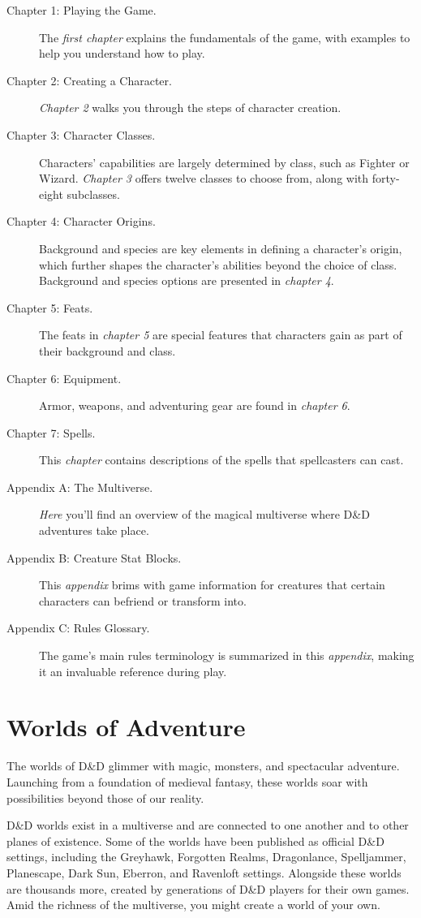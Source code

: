 \documentclass[10pt,a4paper,twoside,bg=print,twocolumn,openany,nodeprecatedcode]{dndbook}
\begin{document}
\begin{description}
\item[Chapter 1: Playing the Game.]
The \textit{first chapter} explains the fundamentals of the game, with examples to help you understand how to play.
\item[Chapter 2: Creating a Character.]
\textit{Chapter 2} walks you through the steps of character creation.
\item[Chapter 3: Character Classes.]
Characters' capabilities are largely determined by class, such as Fighter or Wizard. \textit{Chapter 3} offers twelve classes to choose from, along with forty-eight subclasses.
\item[Chapter 4: Character Origins.]
Background and species are key elements in defining a character's origin, which further shapes the character's abilities beyond the choice of class. Background and species options are presented in \textit{chapter 4}.
\item[Chapter 5: Feats.]
The feats in \textit{chapter 5} are special features that characters gain as part of their background and class.
\item[Chapter 6: Equipment.]
Armor, weapons, and adventuring gear are found in \textit{chapter 6}.
\item[Chapter 7: Spells.]
This \textit{chapter} contains descriptions of the spells that spellcasters can cast.
\item[Appendix A: The Multiverse.]
\textit{Here} you'll find an overview of the magical multiverse where D&D adventures take place.
\item[Appendix B: Creature Stat Blocks.]
This \textit{appendix} brims with game information for creatures that certain characters can befriend or transform into.
\item[Appendix C: Rules Glossary.]
The game's main rules terminology is summarized in this \textit{appendix}, making it an invaluable reference during play.
\end{description}

\section{Worlds of Adventure}
The worlds of D\&D glimmer with magic, monsters, and spectacular adventure. Launching from a foundation of medieval fantasy, these worlds soar with possibilities beyond those of our reality.

D\&D worlds exist in a multiverse and are connected to one another and to other planes of existence. Some of the worlds have been published as official D\&D settings, including the Greyhawk, Forgotten Realms, Dragonlance, Spelljammer, Planescape, Dark Sun, Eberron, and Ravenloft settings. Alongside these worlds are thousands more, created by generations of D\&D players for their own games. Amid the richness of the multiverse, you might create a world of your own.
\end{document}
